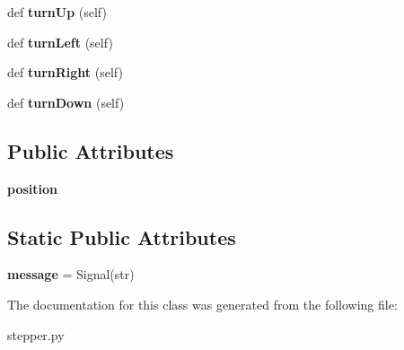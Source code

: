 \begin{DoxyCompactItemize}
\item 
def {\bfseries turn\+Up} (self)\hypertarget{classstepper_1_1_stepper_control_a5f0cf3f69d31cdfc4d3667a64ad341d0}{}\label{classstepper_1_1_stepper_control_a5f0cf3f69d31cdfc4d3667a64ad341d0}

\item 
def {\bfseries turn\+Left} (self)\hypertarget{classstepper_1_1_stepper_control_a4b7c3ae549af80504fd468f217d206cf}{}\label{classstepper_1_1_stepper_control_a4b7c3ae549af80504fd468f217d206cf}

\item 
def {\bfseries turn\+Right} (self)\hypertarget{classstepper_1_1_stepper_control_a5af585807c0a542f56ab03542ac681a4}{}\label{classstepper_1_1_stepper_control_a5af585807c0a542f56ab03542ac681a4}

\item 
def {\bfseries turn\+Down} (self)\hypertarget{classstepper_1_1_stepper_control_a48e1648f38637aed141f495747564bdd}{}\label{classstepper_1_1_stepper_control_a48e1648f38637aed141f495747564bdd}

\end{DoxyCompactItemize}
\subsection*{Public Attributes}
\begin{DoxyCompactItemize}
\item 
{\bfseries position}\hypertarget{classstepper_1_1_stepper_control_a983bf6e742834359344ff84758112cab}{}\label{classstepper_1_1_stepper_control_a983bf6e742834359344ff84758112cab}

\end{DoxyCompactItemize}
\subsection*{Static Public Attributes}
\begin{DoxyCompactItemize}
\item 
{\bfseries message} = Signal(str)\hypertarget{classstepper_1_1_stepper_control_af58d6597631c652cea9f9c9b4486ca3f}{}\label{classstepper_1_1_stepper_control_af58d6597631c652cea9f9c9b4486ca3f}

\end{DoxyCompactItemize}


The documentation for this class was generated from the following file\+:\begin{DoxyCompactItemize}
\item 
stepper.\+py\end{DoxyCompactItemize}
